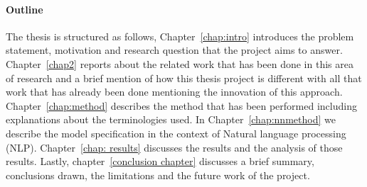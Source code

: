 \paragraph{Outline}
The thesis is structured as follows, Chapter~\ref{chap:intro} introduces the problem statement, motivation and research question that the project aims to answer. Chapter~\ref{chap2} reports about the related work that has been done in this area of research and a brief mention of how this thesis project is different with all that work that has already been done mentioning the innovation of this approach. Chapter~\ref{chap:method} describes the method that has been performed including explanations about the terminologies used. In Chapter~\ref{chap:nnmethod} we describe the model specification in the context of Natural language processing (NLP). Chapter~\ref{chap: results} discusses the results and the analysis of those results. 
Lastly, chapter~\ref{conclusion chapter} discusses a brief summary, conclusions drawn, the limitations and the future work of the project. 